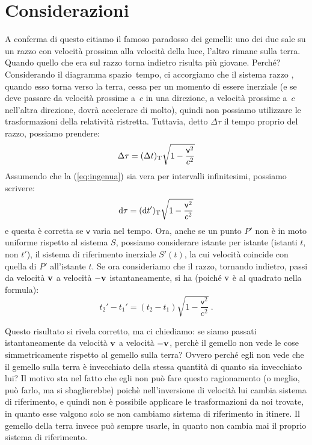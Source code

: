 \section{Considerazioni}
\begin{esempio}
  A conferma di questo citiamo il famoso paradosso dei gemelli: uno
  dei due sale su un razzo con velocit\`a prossima alla velocit\`a
  della luce, l'altro rimane sulla terra. Quando quello che era sul
  razzo torna indietro risulta pi\`u giovane. Perch\'e? Considerando
  il diagramma spazio~tempo, ci accorgiamo che il sistema razzo ,
  quando esso torna verso la terra, cessa per un momento di essere
  inerziale (e se deve passare da velocit\`a prossime a~$c$ in una
  direzione, a velocit\`a prossime a~$c$ nell'altra direzione, dovr\`a
  accelerare di molto), quindi non possiamo utilizzare le
  trasformazioni della relativit\`a ristretta. Tuttavia, detto $\Delta
  \tau$ il tempo proprio del razzo, possiamo prendere:
  \begin{equation}
    \Delta \tau=(\Delta t)_{\mathrm{T}}\sqrt{1-\frac{\mathsf{v}^2}{c^2}}
    \label{eq:ingenua}
  \end{equation}
  Assumendo che la (\ref{eq:ingenua}) sia vera per intervalli
  infinitesimi, possiamo scrivere:
  \begin{equation}
    \mathrm{d} \tau=(\mathrm{d}
    t')_{\mathrm{T}}\sqrt{1-\frac{\mathsf{v}^2}{c^2}}\label{eq:ingenuabis}
  \end{equation}
  e questa \`e corretta se $\mathsf{v}$ varia nel tempo. Ora, anche se
  un punto $P'$ non \`e in moto uniforme rispetto al sistema $S$,
  possiamo considerare istante per istante (istanti $t$, non $t'$), il
  sistema di riferimento inerziale $S'(t)$, la cui velocit\`a coincide
  con quella di $P'$ all'istante $t$. Se ora consideriamo che il
  razzo, tornando indietro, passi da velocit\`a $\mathrm{\mathbf{v}}$ a
  velocit\`a $\mathrm{\mathbf{-v}}$ istantaneamente, si ha (poich\'e
  $\mathrm{v}$ \`e al quadrato nella formula):
  \begin{displaymath}
    t_{2}'-t_{1}'=(t_{2}-t_{1})\sqrt{1-\frac{\mathsf{v}^2}{c^2}}\:.
  \end{displaymath}

Questo risultato si rivela corretto, ma ci chiediamo: se siamo passati
istantaneamente da velocit\`a $\mathrm{\mathbf{v}}$ a velocit\`a
$\mathrm{\mathbf{-v}}$, perch\`e il gemello non vede le cose
simmetricamente rispetto al gemello sulla terra? Ovvero perch\'e egli
non vede che il gemello sulla terra \`e invecchiato della stessa
quantit\`a di quanto sia invecchiato lui? Il motivo sta nel fatto che
egli non pu\`o fare questo ragionamento (o meglio, pu\`o farlo, ma si
sbaglierebbe) poich\`e nell'inversione di velocit\`a lui cambia
sistema di riferimento, e quindi non \`e possibile applicare le
trasformazioni da noi trovate, in quanto esse valgono solo se non
cambiamo sistema di riferimento in itinere. Il gemello della terra
invece pu\`o sempre usarle, in quanto non cambia mai il proprio
sistema di riferimento.
\end{esempio}
